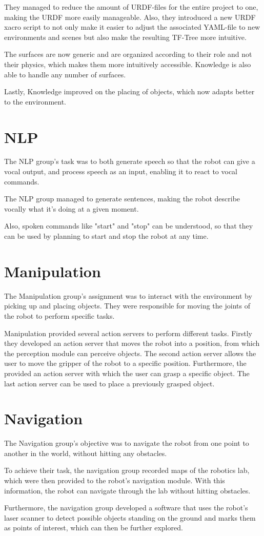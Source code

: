 \documentclass[main.tex]{subfiles}
\begin{document}
		They managed to reduce the amount of URDF-files for the entire project to one, making the URDF more easily manageable.  Also, they introduced a new URDF xacro script to not only make it easier to adjust the associated YAML-file to new environments and scenes but also make the resulting TF-Tree more intuitive.
		
		The surfaces are now generic and are organized according to their role and not their physics, which makes them more intuitively accessible. Knowledge is also able to handle any number of surfaces.
		
		Lastly, Knowledge improved on the placing of objects, which now adapts better to the environment.
		 		
		\section{NLP}
		The NLP group's task was to both generate speech so that the robot can give a vocal output, and process speech as an input, enabling it to react to vocal commands.
		
		The NLP group managed to generate sentences, making the robot describe vocally what it's doing at a given moment.
		
		Also, spoken commands like "start" and "stop" can be understood, so that they can be used by planning to start and stop the robot at any time.
		
		\section{Manipulation}
		The Manipulation group's assignment was to interact with the environment by picking up and placing objects. They were responsible for moving the joints of the robot to perform specific tasks.
		
		Manipulation provided several action servers to perform different tasks. Firstly they developed an action server that moves the robot into a position, from which the perception module can perceive objects. The second action server allows the user to move the gripper of the robot to a specific position. Furthermore, the provided an action server with which the user can grasp a specific object. The last action server can be used to place a previously grasped object.
		
		\section{Navigation}	  	
		The Navigation group's objective was to navigate the robot from one point to another in the world, without hitting any obstacles.
		
		To achieve their task, the navigation group recorded maps of the robotics lab, which were then provided to the robot's navigation module. With this information, the robot can navigate through the lab without hitting obstacles.
		
		Furthermore, the navigation group developed a software that uses the robot's laser scanner to detect possible objects standing on the ground and marks them as points of interest, which can then be further explored.

		
	\endgroup
\end{document}
